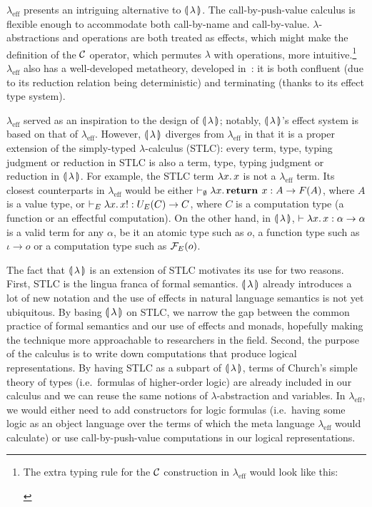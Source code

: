 \begin{itemize}
  $\lambda_{\mathrm{eff}}$ presents an intriguing alternative to
  $\calc$. The call-by-push-value calculus is flexible enough to
  accommodate both call-by-name and call-by-value. $\lambda$-abstractions
  and operations are both treated as effects, which might make the
  definition of the $\CC$ operator, which permutes $\lambda$ with
  operations, more intuitive.\footnote{The extra typing rule for the $\CC$
    construction in $\lambda_{\mathrm{eff}}$ would look like this:
    \begin{prooftree}
    \end{prooftree}} $\lambda_{\mathrm{eff}}$ also has a well-developed
  metatheory, developed in~\cite{kammar2013handlers}: it is both confluent
  (due to its reduction relation being deterministic) and terminating
  (thanks to its effect type system).

  $\lambda_{\mathrm{eff}}$ served as an inspiration to the design of
  $\calc$; notably, $\calc$'s effect system is based on that of
  $\lambda_{\mathrm{eff}}$. However, $\calc$ diverges from
  $\lambda_{\mathrm{eff}}$ in that it is a proper extension of the
  simply-typed $\lambda$-calculus (STLC): every term, type, typing judgment
  or reduction in STLC is also a term, type, typing judgment or reduction
  in $\calc$. For example, the STLC term $\lam{x}{x}$ is not a
  $\lambda_{\mathrm{eff}}$ term. Its closest counterparts in
  $\lambda_{\mathrm{eff}}$ would be either
  $\vdash_\emptyset \lam{x}{\textbf{return } x} : A \to F(A)$, where $A$ is
  a value type, or $\vdash_E \lam{x}{x!} : U_E(C) \to C$, where $C$ is a
  computation type (a function or an effectful computation). On the other
  hand, in $\calc$, $\vdash \lam{x}{x} : \alpha \to \alpha$ is a valid term
  for any $\alpha$, be it an atomic type such as $o$, a function type such
  as $\iota \to o$ or a computation type such as $\FF_E(o)$.

  The fact that $\calc$ is an extension of STLC motivates its use for two
  reasons. First, STLC is the lingua franca of formal semantics. $\calc$
  already introduces a lot of new notation and the use of effects in
  natural language semantics is not yet ubiquitous. By basing $\calc$ on
  STLC, we narrow the gap between the common practice of formal semantics
  and our use of effects and monads, hopefully making the technique more
  approachable to researchers in the field. Second, the purpose of the
  calculus is to write down computations that produce logical
  representations. By having STLC as a subpart of $\calc$, terms of
  Church's simple theory of types (i.e.\ formulas of higher-order logic)
  are already included in our calculus and we can reuse the same notions of
  $\lambda$-abstraction and variables. In $\lambda_{\mathrm{eff}}$, we
  would either need to add constructors for logic formulas (i.e.\ having
  some logic as an object language over the terms of which the meta
  language $\lambda_{\mathrm{eff}}$ would calculate) or use
  call-by-push-value computations in our logical representations.


\end{itemize}
